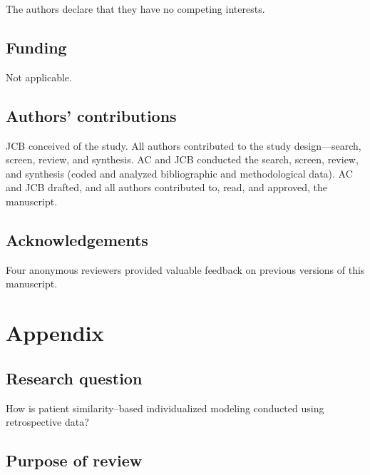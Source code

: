 \documentclass[sn-mathphys,Numbered,pdflatex]{sn-jnl}
\theoremstyle{remark}
\theoremstyle{definition}
\newcommand{\hl}[1]{#1}
\begin{document}
The authors declare that they have no competing interests.

\subsection*{Funding}\label{funding}

Not applicable.

\subsection*{Authors' contributions}\label{authors-contributions}

JCB conceived of the study. All authors contributed to the study
design---search, screen, review, and synthesis. AC and JCB conducted the
search, screen, review, and synthesis (coded and analyzed bibliographic
and methodological data). AC and JCB drafted, and all authors
contributed to, read, and approved, the manuscript.

\subsection*{Acknowledgements}\label{acknowledgements}

\hl{Four} anonymous reviewers provided valuable feedback on \hl{previous versions}
of this manuscript.

\pagebreak

\section*{Appendix}\label{appendix}

\subsection*{Research question}\label{research-question}

How is patient similarity--based individualized modeling conducted using
retrospective data?

\subsection*{Purpose of review}\label{purpose-of-review}
\end{document}
